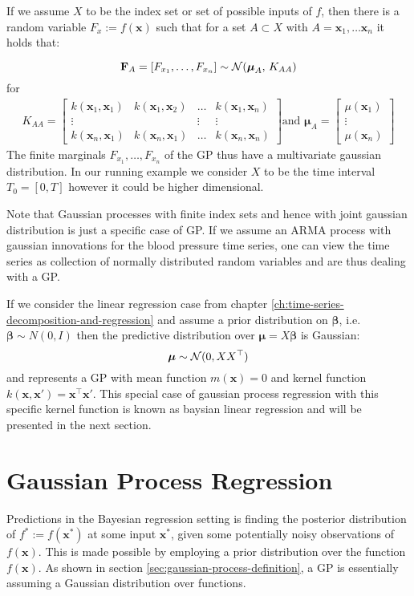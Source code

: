 If we assume $X$ to be the index set or set of possible inputs of $f$, then there is a random variable
$F_x := f(\mathbf{x})$ such that for a set $A \subset X$ with $A={\mathbf{x}_1, \dots \mathbf{x}_n}$ it holds that:

\[\mathbf{F}_A = [F_{x_1}, \dots , F_{x_n}] \sim \operatorname{\mathcal{N}}(\boldsymbol{\mu}_A,\,K_{AA})\]
for
\begin{gather}\label{def:Kernel-Matrix}
    K_{AA} =
    \begin{bmatrix}
        k(\mathbf{x}_1, \mathbf{x}_1) & k(\mathbf{x}_1, \mathbf{x}_2) & \dots & k(\mathbf{x}_1, \mathbf{x}_n)\\
        \vdots  &  & \vdots  & \vdots \\
        k(\mathbf{x}_n, \mathbf{x}_1)  & k(\mathbf{x}_n, \mathbf{x}_1) & \dots  & k(\mathbf{x}_n, \mathbf{x}_n)
    \end{bmatrix} \text{and }
    \boldsymbol{\mu}_A =
    \begin{bmatrix}
        \mu(\mathbf{x}_1) \\
        \vdots \\
        \mu(\mathbf{x}_n)
    \end{bmatrix}
\end{gather}
The finite marginals $F_{x_1}, \dots, F_{x_n}$ of the GP thus have a multivariate gaussian distribution.
In our running example we consider $X$ to be the time interval $T_0=[0, T]$ however it could be higher dimensional.

Note that Gaussian processes with finite index sets and hence with joint gaussian distribution is just a specific case
of GP. If we assume an ARMA process with gaussian innovations for the blood pressure time series, one can view the time series
as collection of normally distributed random variables and are thus dealing with a GP.


If we consider the linear regression case from chapter \ref{ch:time-series-decomposition-and-regression} and assume a
prior distribution
on $\boldsymbol{\beta}$, i.e. $\boldsymbol{\beta} \sim N(0, I)$ then the predictive distribution over $\boldsymbol{\mu} = X \boldsymbol{\beta}$ is Gaussian:
\[
    \boldsymbol{\mu} \sim \operatorname{\mathcal{N}}(0, XX^{\top})
\]
and represents a GP with mean function $m(\mathbf{x}) = 0$ and kernel function $k(\mathbf{x}, \mathbf{x}') = \mathbf{x}^{\top}\mathbf{x}'$.
This special case of gaussian process regression with this specific kernel function is known as baysian linear regression
and will be presented in the next section.


\section{Gaussian Process Regression}
Predictions in the Bayesian regression setting is finding the posterior distribution of
$f^{\ast} := f(\mathbf{x}^{\ast})$ at some input $\mathbf{x}^{\ast}$, given some potentially noisy observations of $f(\mathbf{x})$.
This is made possible by employing a prior distribution
over the function $f(\mathbf{x})$. As shown in section \ref{sec:gaussian-process-definition}, a GP is essentially
assuming a Gaussian distribution over functions.


